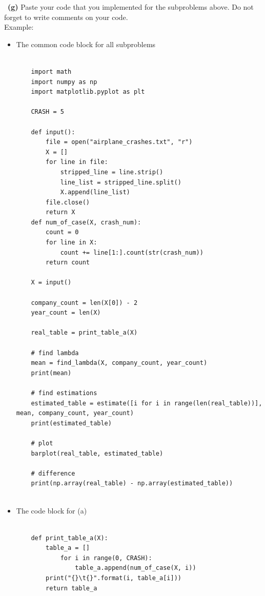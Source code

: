 \documentclass[a4 paper]{article}
\numberwithin{equation}{section}
\newcommand{\subproblem}[1]{~\newline\textbf{(#1)}}
\newcommand{\0}{\mathbf{0}}
\begin{document}
\subproblem{g} Paste your code that you implemented for the subproblems above. Do not forget to write comments on your code.\\
Example:\\
\begin{itemize}
	\item The common code block for all subproblems\\
	\begin{verbatim}
               
    import math
    import numpy as np
    import matplotlib.pyplot as plt

    CRASH = 5

    def input():
        file = open("airplane_crashes.txt", "r")
        X = []
        for line in file:
            stripped_line = line.strip()
            line_list = stripped_line.split()
            X.append(line_list)
        file.close()
        return X
    def num_of_case(X, crash_num):
        count = 0
        for line in X:
            count += line[1:].count(str(crash_num))
        return count
        
    X = input()

    company_count = len(X[0]) - 2
    year_count = len(X)

    real_table = print_table_a(X)

    # find lambda
    mean = find_lambda(X, company_count, year_count)
    print(mean)

    # find estimations
    estimated_table = estimate([i for i in range(len(real_table))], mean, company_count, year_count)
    print(estimated_table)

    # plot
    barplot(real_table, estimated_table)

    # difference
    print(np.array(real_table) - np.array(estimated_table))
  
\end{verbatim}
	\item The code block for (a)\\
	\begin{verbatim}
               
    def print_table_a(X):
        table_a = []
            for i in range(0, CRASH):
                table_a.append(num_of_case(X, i))
        print("{}\t{}".format(i, table_a[i]))
        return table_a
  

\end{verbatim}
\end{itemize}
\end{document}
